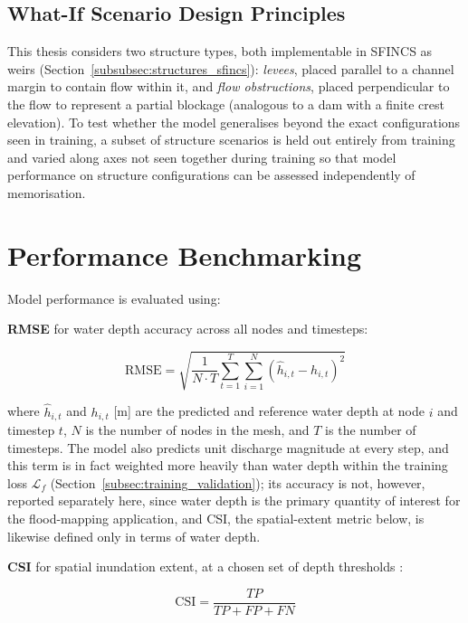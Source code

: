 \documentclass[12pt,a4paper]{report}
\begin{document}
 
\subsection{What-If Scenario Design Principles}
\label{subsec:whatif_framework}
 
This thesis considers two structure types, both implementable in SFINCS as weirs
(Section~\ref{subsubsec:structures_sfincs}): \emph{levees}, placed parallel to a channel
margin to contain flow within it, and \emph{flow obstructions}, placed perpendicular to
the flow to represent a partial blockage (analogous to a dam with a finite crest
elevation). To test whether the model generalises beyond the exact configurations seen
in training, a subset of structure scenarios is held out entirely from training
and varied along axes not seen together during training so that model performance on
structure configurations can be assessed independently of memorisation.
 
\section{Performance Benchmarking}
\label{sec:benchmarking}
 
Model performance is evaluated using:
 
\textbf{RMSE} for water depth accuracy across all nodes and timesteps:
 
\begin{equation}
    \text{RMSE} = \sqrt{\frac{1}{N \cdot T} \sum_{t=1}^{T} \sum_{i=1}^{N}
    \left(\hat{h}_{i,t} - h_{i,t}\right)^2}
    \label{eq:rmse}
\end{equation}
 
where $\hat{h}_{i,t}$ and $h_{i,t}$ [m] are the predicted and reference water depth at
node $i$ and timestep $t$, $N$ is the number of nodes in the mesh, and $T$ is the
number of timesteps. The model also predicts unit discharge magnitude at every step,
and this term is in fact weighted more heavily than water depth within the training
loss $\mathcal{L}_f$ (Section~\ref{subsec:training_validation}); its accuracy is not,
however, reported separately here, since water depth is the primary quantity of
interest for the flood-mapping application, and CSI, the spatial-extent metric below,
is likewise defined only in terms of water depth.


\textbf{CSI} for spatial inundation extent, at a chosen set of depth thresholds
\citep{schaefer1990csi,aronica2002assessing}:
 
\begin{equation}
    \text{CSI} = \frac{TP}{TP + FP + FN}
    \label{eq:csi}
\end{equation}
 
\end{document}
